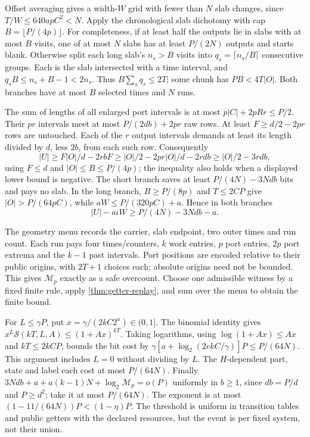 \begin{outline}
Offset averaging gives a width-$W$ grid with fewer than $N$ slab changes,
since $T/W\le640apC^2<N$. Apply the chronological slab dichotomy with
cap $B=\lfloor P/(4p)\rfloor$. For completeness, if at least half the
outputs lie in slabs with at most $B$ visits, one of at most $N$ slabs
has at least $P/(2N)$ outputs and starts blank. Otherwise split each long
slab's $n_s>B$ visits into $q_s=\lceil n_s/B\rceil$ consecutive groups.
Each is the slab intersected with a time interval, and
$q_sB\le n_s+B-1<2n_s$. Thus $B\sum_s q_s\le2T$; some chunk has
$PB<4T|O|$. Both branches have at most $B$ selected times and $N$ runs.

The sum of lengths of all enlarged port intervals is at most
$p|C|+2pRr\le P/2$. Their $pr$ intervals meet at most
$P/(2db)+2pr$ raw rows. At least $F\ge d/2-2pr$ rows are untouched.
Each of the $r$ output intervals demands at least its length divided by
$d$, less $2b$, from each such row. Consequently
\[
 |U|\ge F|O|/d-2rbF
 \ge |O|/2-2pr|O|/d-2rdb\ge |O|/2-3rdb,
\]
using $F\le d$ and $|O|\le B\le P/(4p)$; the inequality also holds
when a displayed lower bound is negative. The short branch saves at least
$P/(4N)-3Ndb$ bits and pays no slab. In the long branch,
$B\ge P/(8p)$ and $T\le2CP$ give $|O|>P/(64pC)$, while
$aW\le P/(320pC)+a$. Hence in both branches
\[
 |U|-a\iota W\ge P/(4N)-3Ndb-a.
\]

The geometry menu records the carrier, slab endpoint, two outer times and
run count. Each run pays four times/counters, $k$ work entries, $p$ port
entries, $2p$ port extrema and the $k-1$ past intervals. Port positions
are encoded relative to their public origins, with $2T+1$ choices each;
absolute origins need not be bounded. This gives $\mathcal M_p$ exactly
as a safe overcount. Choose one admissible witness by a fixed finite rule,
apply \cref{thm:getter-replay}, and sum over the menu to obtain the finite
bound.

For $L\le\gamma P$, put $x=\gamma/(2kC2^a)\in(0,1]$.
The binomial identity gives
$x^L\mathcal S(kT,L,A)\le(1+Ax)^{kT}$.
Taking logarithms, using $\log(1+Ax)\le Ax$ and $kT\le2kCP$,
bounds the bit cost by
$\gamma[a+\log_2(2ekC/\gamma)]P\le P/(64N)$.
This argument includes $L=0$ without dividing by $L$.
The $H$-dependent part, state and label each cost at most $P/(64N)$.
Finally $3Ndb+a+a(k-1)N+\log_2\mathcal M_p=o(P)$ uniformly in
$b\ge1$, since $db=P/d$ and $P\ge d^2$; take it at most $P/(64N)$.
The exponent is at most $(1-11/(64N))P<(1-\eta)P$.
The threshold is uniform in transition tables and public getters with the
declared resources, but the event is per fixed system, not their union.
\end{outline}

